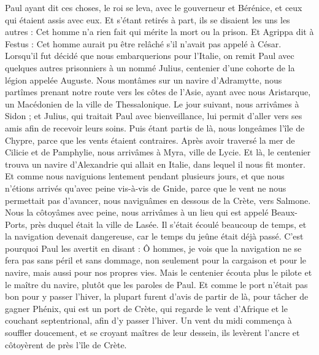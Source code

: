 \begin{multicols}{2}
{{{Paul ayant dit ces choses, le roi se leva, avec le gouverneur et Bérénice, et ceux qui étaient assis avec eux.
Et s'étant retirés à part, ils se disaient les uns les autres : Cet homme n'a rien fait qui mérite la mort ou la prison.
Et Agrippa dit à Festus : Cet homme aurait pu être relâché s'il n'avait pas appelé à César.
\VerseOne{}Lorsqu'il fut décidé que nous embarquerions pour l'Italie, on remit Paul avec quelques autres prisonniers à un nommé Julius, centenier d'une cohorte de la légion appelée Auguste.
Nous montâmes sur un navire d'Adramytte, nous partîmes prenant notre route vers les côtes de l'Asie, ayant avec nous Aristarque, un Macédonien de la ville de Thessalonique.
Le jour suivant, nous arrivâmes à Sidon ; et Julius, qui traitait Paul avec bienveillance, lui permit d'aller vers ses amis afin de recevoir leurs soins.
Puis étant partis de là, nous longeâmes l'île de Chypre, parce que les vents étaient contraires.
Après avoir traversé la mer de Cilicie et de Pamphylie, nous arrivâmes à Myra, ville de Lycie.
Et là, le centenier trouva un navire d'Alexandrie qui allait en Italie, dans lequel il nous fit monter.
Et comme nous naviguions lentement pendant plusieurs jours, et que nous n'étions arrivés qu'avec peine vis-à-vis de Gnide, parce que le vent ne nous permettait pas d'avancer, nous naviguâmes en dessous de la Crète, vers Salmone.
Nous la côtoyâmes avec peine, nous arrivâmes à un lieu qui est appelé Beaux-Ports, près duquel était la ville de Lasée.
Il s'était écoulé beaucoup de temps, et la navigation devenait dangereuse, car le temps du jeûne était déjà passé.
C'est pourquoi Paul les avertit en disant : Ô hommes, je vois que la navigation ne se fera pas sans péril et sans dommage, non seulement pour la cargaison et pour le navire, mais aussi pour nos propres vies.
Mais le centenier écouta plus le pilote et le maître du navire, plutôt que les paroles de Paul.
Et comme le port n'était pas bon pour y passer l'hiver, la plupart furent d'avis de partir de là, pour tâcher de gagner Phénix, qui est un port de Crète, qui regarde le vent d'Afrique et le couchant septentrional, afin d'y passer l'hiver.
Un vent du midi commença à souffler doucement, et se croyant maîtres de leur dessein, ils levèrent l'ancre et côtoyèrent de près l'île de Crète.
}}}
\end{multicols}
